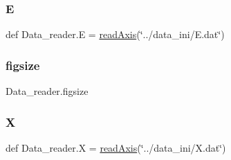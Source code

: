 \subsubsection{\texorpdfstring{E}{E}}
{\footnotesize\ttfamily def Data\+\_\+reader.\+E = \hyperlink{namespaceData__reader_a25f545e44fef1e7847d2b4d7cfef6a89}{read\+Axis}(\char`\"{}../data\+\_\+ini/E.\+dat\char`\"{})}

\mbox{\label{namespaceData__reader_afaa0dc6600cad3c49b6b7247fb51ef17}} 
\subsubsection{\texorpdfstring{figsize}{figsize}}
{\footnotesize\ttfamily Data\+\_\+reader.\+figsize}

\mbox{\label{namespaceData__reader_acd1bcfe63b551d6fd971c84f4542222e}} 
\subsubsection{\texorpdfstring{X}{X}}
{\footnotesize\ttfamily def Data\+\_\+reader.\+X = \hyperlink{namespaceData__reader_a25f545e44fef1e7847d2b4d7cfef6a89}{read\+Axis}(\char`\"{}../data\+\_\+ini/X.\+dat\char`\"{})}

